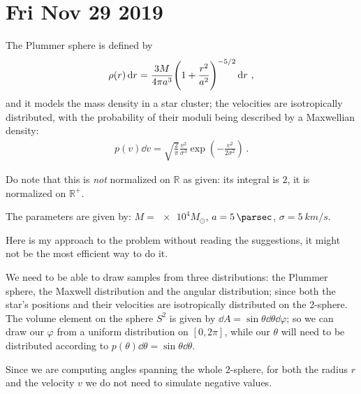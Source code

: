 \documentclass[main.tex]{subfiles}
\begin{document}
\section*{Fri Nov 29 2019}

The Plummer sphere is defined by 
%
\begin{align}
  \rho (r) \dd{r} = \frac{3M}{4 \pi a^3} \qty(1 + \frac{r^2}{a^2})^{-5/2} \dd{r}
\,,
\end{align}
%
and it models the mass density in a star cluster; the velocities are isotropically distributed, with the probability of their moduli being described by a Maxwellian density: 
%
\begin{align}
  p(v) \dd{v} = \sqrt{\frac{2}{\pi }} \frac{v^2}{\sigma^3}
  \exp( -\frac{v^2}{2 \sigma^2})
\,.
\end{align}

Do note that this is \emph{not} normalized on \(\mathbb{R}\) as given: its integral is \(2\), it is normalized on \(\mathbb{R}^{+}\).

The parameters are given by: \(M = \num{e4} M_{\odot}\), \(a = \SI{5}{\parsec}\), \(\sigma = \SI{5}{km/s}\).

Here is my approach to the problem without reading the suggestions, it might not be the most efficient way to do it. 

We need to be able to draw samples from three distributions: the Plummer sphere, the Maxwell distribution and the angular distribution; since both the star's positions and their velocities are isotropically distributed on the 2-sphere. 
The volume element on the sphere \(S^{2}\) is given by \(\dd{A} = \sin \theta \dd{\theta } \dd{\varphi }\); so we can draw our \(\varphi \) from a uniform distribution on \([0, 2 \pi ]\), while our \(\theta \) will need to be distributed according to \(p(\theta ) \dd{\theta }= \sin \theta \dd{\theta }  \). 

Since we are computing angles spanning the whole \(2\)-sphere, for both the radius \(r\) and the velocity \(v\) we do not need to simulate negative values.


 
\end{document}

